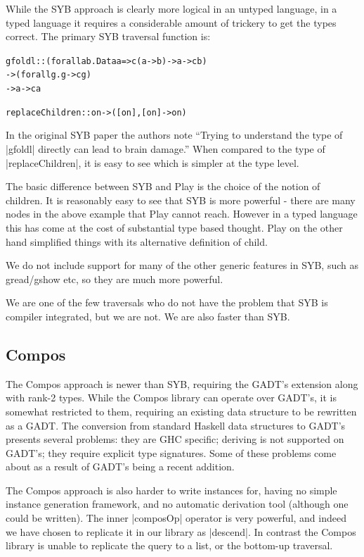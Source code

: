 \documentclass[preprint]{sigplanconf}
\newenvironment{code}{\begin{alltt}\small}{\end{alltt}}
\begin{document}
While the SYB approach is clearly more logical in an untyped language, in a typed language it requires a considerable amount of trickery to get the types correct. The primary SYB traversal function is:

\begin{code}
gfoldl  ::  (forall a b . Data a => c (a -> b) -> a -> c b)
        ->  (forall g . g -> c g)
        ->  a -> c a

replaceChildren :: on -> ([on], [on] -> on)
\end{code}

In the original SYB paper the authors note ``Trying to understand the type of |gfoldl| directly can lead to brain damage.'' When compared to the type of |replaceChildren|, it is easy to see which is simpler at the type level.

\begin{code}
\end{code}

The basic difference between SYB and Play is the choice of the notion of children. It is reasonably easy to see that SYB is more powerful - there are many nodes in the above example that Play cannot reach. However in a typed language this has come at the cost of substantial type based thought. Play on the other hand simplified things with its alternative definition of child.

We do not include support for many of the other generic features in SYB, such as gread/gshow etc, so they are much more powerful.

We are one of the few traversals who do not have the problem that SYB is compiler integrated, but we are not. We are also faster than SYB.

\subsection{Compos}

The Compos approach is newer than SYB, requiring the GADT's extension along with rank-2 types. While the Compos library can operate over GADT's, it is somewhat restricted to them, requiring an existing data structure to be rewritten as a GADT. The conversion from standard Haskell data structures to GADT's presents several problems: they are GHC specific; deriving is not supported on GADT's; they require explicit type signatures. Some of these problems come about as a result of GADT's being a recent addition.

The Compos approach is also harder to write instances for, having no simple instance generation framework, and no automatic derivation tool (although one could be written). The inner |composOp| operator is very powerful, and indeed we have chosen to replicate it in our library as |descend|. In contrast the Compos library is unable to replicate the query to a list, or the bottom-up traversal.
\end{document}
